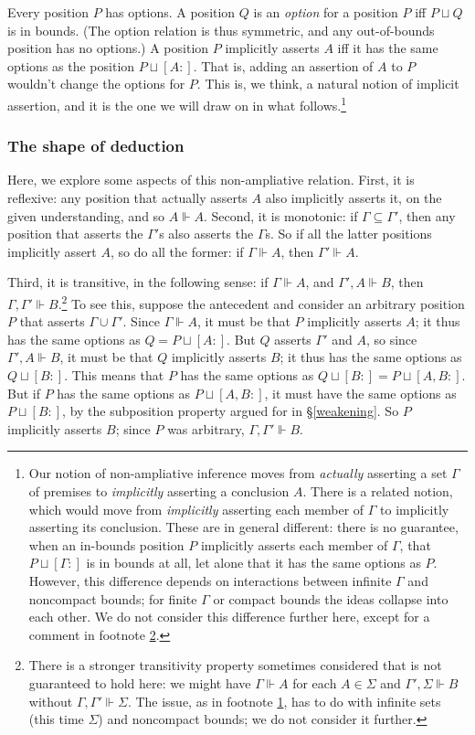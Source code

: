 \documentclass{article}
\newcommand{\G}{\ensuremath{\Gamma}}
\newcommand{\Sig}{\ensuremath{\Sigma}}
\newcommand{\pcup}{\ensuremath{\sqcup}}
\newcommand{\pos}[2]{\ensuremath{[#1:#2]}}
\newcommand{\ded}{\Vdash}
\begin{document}
Every position $P$ has options.
A position $Q$ is an {\em option} for a position $P$ iff $P \pcup Q$ is in bounds.
(The option relation is thus symmetric, and any out-of-bounds position has no options.)
A position $P$ implicitly asserts $A$ iff it has the same options as the position $P \pcup \pos{A}{}$.
That is, adding an assertion of $A$ to $P$ wouldn't change the options for $P$.
This is, we think, a natural notion of implicit assertion, and it is the one we will draw on in what follows.\footnote{\label{fn-compact-1}Our notion of non-ampliative inference moves from {\em actually} asserting a set $\G$ of premises to {\em implicitly} asserting a conclusion $A$.
There is a related notion, which would move from {\em implicitly} asserting each member of $\G$ to implicitly asserting its conclusion.
These are in general different: there is no guarantee, when an in-bounds position $P$ implicitly asserts each member of $\G$, that $P \pcup \pos{\G}{}$ is in bounds at all, let alone that it has the same options as $P$.
However, this difference depends on interactions between infinite $\G$ and noncompact bounds; for finite $\G$ or compact bounds the ideas collapse into each other.
We do not consider this difference further here, except for a comment in footnote \ref{fn-compact-2}.
}


\subsubsection{The shape of deduction}

Here, we explore some aspects of this non-ampliative relation.
First, it is reflexive: any position that actually asserts $A$ also implicitly asserts it, on the given understanding, and so $A \ded A$. Second, it is monotonic: if $\G \subseteq \G'$, then any position that asserts the $\G'$s also asserts the $\G$s. So if all the latter positions implicitly assert $A$, so do all the former: if $\G \ded A$, then $\G' \ded A$.

Third, it is transitive, in the following sense: if $\G \ded A$, and $\G', A \ded B$, then $\G, \G' \ded B$.\footnote{\label{fn-compact-2}There is a stronger transitivity property sometimes considered that is not guaranteed to hold here: we might have $\G \ded A$ for each $A \in \Sig$ and $\G', \Sig \ded B$ without $\G, \G' \ded \Sig$.
The issue, as in footnote \ref{fn-compact-1}, has to do with infinite sets (this time $\Sig$) and noncompact bounds; we do not consider it further.
}
To see this, suppose the antecedent and consider an arbitrary position $P$ that asserts $\G \cup \G'$.
Since $\G \ded A$, it must be that $P$ implicitly asserts $A$; it thus has the same options as $Q = P \pcup \pos{A}{}$. 
But $Q$ asserts $\G'$ and $A$, so since $\G', A \ded B$, it must be that $Q$ implicitly asserts $B$; it thus has the same options as $Q \pcup \pos{B}{}$.
This means that $P$ has the same options as $Q \pcup \pos{B}{} = P \pcup \pos{A, B}{}$.
But if $P$ has the same options as $P \pcup \pos{A, B}{}$, it must have the same options as $P \pcup \pos{B}{}$, by the subposition property argued for in \S\ref{weakening}.
So $P$ implicitly asserts $B$; since $P$ was arbitrary, $\G, \G' \ded B$.
\end{document}
